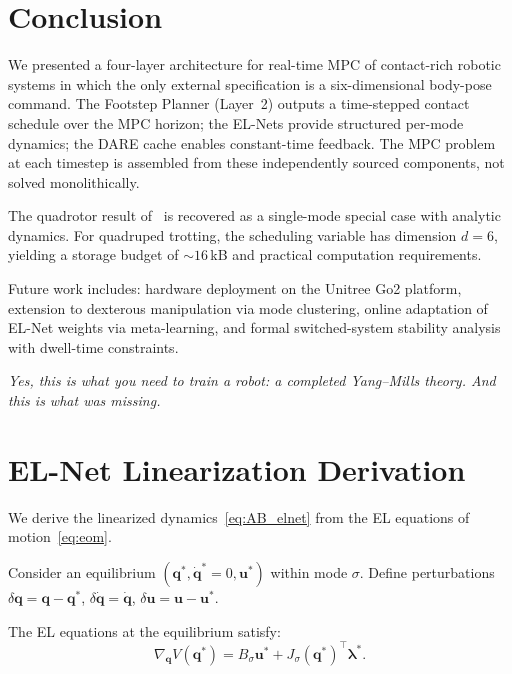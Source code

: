 \documentclass[letterpaper, 10pt, conference]{IEEEtran}
\newcommand{\bu}{\bm{u}}
\newcommand{\bq}{\bm{q}}
\begin{document}
\section{Conclusion}\label{sec:conclusion}

We presented a four-layer architecture for real-time MPC
of contact-rich robotic systems in which the only external
specification is a six-dimensional body-pose command.
The Footstep Planner (Layer~2) outputs a time-stepped
contact schedule over the MPC horizon;
the EL-Nets provide structured per-mode dynamics;
the DARE cache enables constant-time feedback.
The MPC problem at each timestep is assembled from these
independently sourced components, not solved monolithically.

The quadrotor result of~\cite{zhang2025flat} is recovered
as a single-mode special case with analytic dynamics.
For quadruped trotting, the scheduling variable has
dimension $d = 6$, yielding a storage budget of
${\sim}16$\,kB and practical computation requirements.

Future work includes:
hardware deployment on the Unitree Go2 platform,
extension to dexterous manipulation via mode clustering,
online adaptation of EL-Net weights via meta-learning,
and formal switched-system stability analysis
with dwell-time constraints.

\medskip
\noindent\textit{Yes, this is what you need to train a robot:
a completed Yang--Mills theory.
And this is what was missing.}

\appendix

\section{EL-Net Linearization Derivation}\label{app:linearization}

We derive the linearized dynamics~\eqref{eq:AB_elnet}
from the EL equations of motion~\eqref{eq:eom}.

Consider an equilibrium $(\bq^*, \dot{\bq}^* = 0, \bu^*)$
within mode $\sigma$.
Define perturbations $\delta\bq = \bq - \bq^*$,
$\delta\dot{\bq} = \dot{\bq}$,
$\delta\bu = \bu - \bu^*$.

The EL equations at the equilibrium satisfy:
\begin{equation}\label{eq:eom_eq}
  \nabla_{\bq} V(\bq^*) = B_\sigma \bu^*
    + J_\sigma(\bq^*)^\top \bm{\lambda}^*.
\end{equation}
\end{document}
